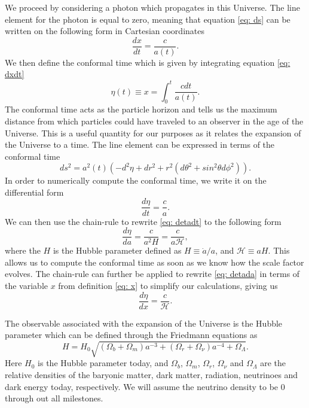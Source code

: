 \documentclass[a4paper, 10pt, reqno]{amsart}
\begin{document}
We proceed by considering a photon which propagates in this Universe.
The line element for the photon is equal to zero, meaning that equation
\eqref{eq: ds} can be written on the following form in Cartesian
coordinates
\begin{equation}\label{eq: dxdt}
    \frac{dx}{dt} = \frac{c}{a(t)}.
\end{equation}
We then define the conformal time which is given by integrating
equation \eqref{eq: dxdt}
\begin{equation}\label{eq: eta}
    \eta(t) \equiv x = \int_0^{t} \frac{c dt}{a(t)}.
\end{equation}
The conformal time acts as the particle horizon and tells us the
maximum distance from which particles could have traveled to an
observer in the age of the Universe. This is a useful quantity for our
purposes as it relates the expansion of the Universe to a time. The
line element can be expressed in terms of the conformal time
\begin{equation}\label{eq: ds_eta}
    ds^2 = a^2(t) \left( -d^2\eta + dr^2 + r^2(d\theta^2 + sin^2\theta
    d\phi^2) \right).
\end{equation}
In order to numerically compute the conformal time, we write it on the
differential form
\begin{equation}\label{eq: detadt}
    \frac{d\eta}{dt} = \frac{c}{a}.
\end{equation}
We can then use the chain-rule to rewrite \eqref{eq: detadt} to the
following form
\begin{equation}\label{eq: detada}
    \frac{d \eta}{da} = \frac{c}{a^2 H} = \frac{c}{a \mathcal{H}},
\end{equation}
where the $H$ is the Hubble parameter defined as $H \equiv \Dot{a}/a$,
and $\mathcal{H} \equiv aH$. This allows us to compute the conformal
time as soon as we know how the scale factor evolves. The chain-rule
can further be applied to rewrite \eqref{eq: detada} in terms of the
variable $x$ from definition \eqref{eq: x} to simplify our
calculations, giving us
\begin{equation}\label{eq: detadx}
    \frac{d \eta}{dx} = \frac{c}{\mathcal{H}}.
\end{equation}

The observable associated with the expansion of the Universe is the
Hubble parameter which can be defined through the Friedmann equations
as
\begin{equation}\label{eq: Hubble}
    H = H_0 \sqrt{(\Omega_b + \Omega_m)a^{-3} + (\Omega_r +
    \Omega_\nu)a^{-4} +\Omega_\Lambda}.
\end{equation}
Here $H_0$ is the Hubble parameter today, and $\Omega_b$, $\Omega_m$,
$\Omega_r$, $\Omega_\nu$ and $\Omega_\Lambda$ are the relative
densities of the baryonic matter, dark matter, radiation, neutrinoes
and dark energy today, respectively. We will assume the neutrino
density to be 0 through out all milestones. 
\end{document}
